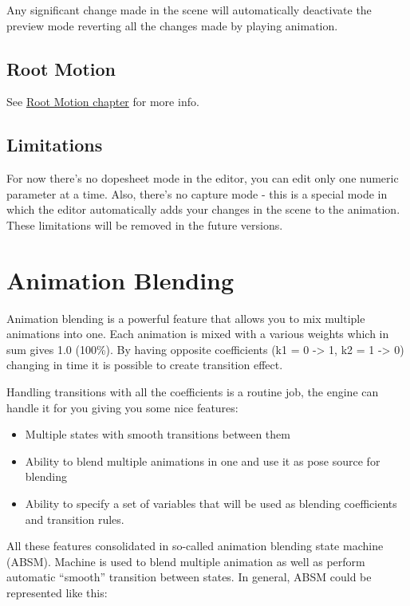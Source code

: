 \documentclass[
]{book}
\providecommand{\tightlist}{%
  \setlength{\itemsep}{0pt}\setlength{\parskip}{0pt}}
\theoremstyle{definition}
\theoremstyle{definition}
\theoremstyle{definition}
\theoremstyle{definition}
\theoremstyle{remark}
\begin{document}
Any significant change made in the scene will automatically deactivate the preview mode reverting all the changes made by playing animation.

\subsection{Root Motion}\label{root-motion}

See \href{root_motion/root_motion.md}{Root Motion chapter} for more info.

\subsection{Limitations}\label{limitations-2}

For now there's no dopesheet mode in the editor, you can edit only one numeric parameter at a time. Also, there's no capture mode - this is a special mode in which the editor automatically adds your changes in the scene to the animation. These limitations will be removed in the future versions.

\section{Animation Blending}\label{animation-blending}

Animation blending is a powerful feature that allows you to mix multiple animations into one. Each animation is mixed with a various weights which in sum gives 1.0 (100\%). By having opposite coefficients (k1 = 0 -\textgreater{} 1, k2 = 1 -\textgreater{} 0) changing in time it is possible to create transition effect.

Handling transitions with all the coefficients is a routine job, the engine can handle it for you giving you some nice
features:

\begin{itemize}
\tightlist
\item
  Multiple states with smooth transitions between them
\item
  Ability to blend multiple animations in one and use it as pose source for blending
\item
  Ability to specify a set of variables that will be used as blending coefficients and transition rules.
\end{itemize}

All these features consolidated in so-called animation blending state machine (ABSM). Machine is used to blend multiple animation as well as perform automatic ``smooth'' transition between states. In general, ABSM could be represented like this:
\end{document}
